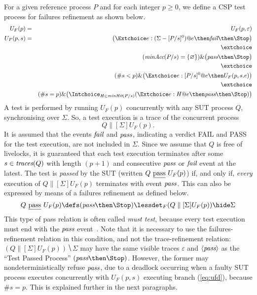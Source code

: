For a given reference process $P$ and for each integer $p\ge 0$, we define a
CSP test process for failures refinement as shown below.
%
\begin{eqnarray}
U_F(p) & = & U_F(p,\varepsilon)
\\
U_F(p,s) & = & \big( \Extchoice e:(\Sigma - [P/s]^0) @ e \then \efail\then \Stop \big)
\label{eq:ufa}
\\ & & \extchoice \nonumber
\\ & & (\minaccs(P/s) = \{ \varnothing \})    \&   \big( \epass \then \Stop \big)
\label{eq:ufb}
\\ & & \extchoice \nonumber
\\ & & (\#s < p) \& \big( \Extchoice e:[P/s]^0 @ e \then U_F(p,s.e) \big)
\label{eq:ufc}
\\ & & \extchoice \nonumber
\\ & & (\#s = p ) \& \big( \Intchoice_{H\in\minhits(P/s)} ( \Extchoice e:H @ e \then \epass \then\Stop   )  \big)
\label{eq:ufd}
\end{eqnarray}
%
A test is performed by running $U_F(p)$ concurrently with any SUT process
$Q$, synchronising over $\Sigma$. So, a test execution is a trace of
the concurrent process
\[
Q\parallel[\Sigma] U_F(p).
\]
It is assumed that the events ${\text{\it fail}}$ and ${\text{\it pass}}$, indicating a verdict
FAIL and PASS for the test execution, are not included in $\Sigma$. Since we
assume that $Q$ is free of livelocks, it is guaranteed that each test
execution terminates after some $s\in\text{\it traces}(Q)$ with length $(p+1)$ and
consecutive ${\text{\it pass}}$ or ${\text{\it fail}}$ event at the latest. The test is
\emph{passed} by the SUT (written $Q\ \pass\ U_F(p)$) if, and only if, {\it
every} execution of $Q\parallel[\Sigma] U_F(p)$ terminates with   event
${\text{\it pass}}$. This can also be  expressed by means of a failures refinement as
defined below.
%
\begin{equation}
\label{eq:passF}
Q\ \pass\ U_F(p) \defs (\epass\then\Stop) \lessdet_F (Q\parallel[\Sigma] U_F(p)) \hide \Sigma
\end{equation}
%
This type of pass relation is often called \emph{must test}, because every
test execution must end with the ${\text{\it pass}}$
event~\cite{Hennessy:1988:ATP:50497}. Note that it is necessary to use the
failures-refinement relation in this condition, and not the trace-refinement
relation:~$(Q\parallel[\Sigma] U_F(p)) \hide \Sigma$ may have  the same
visible traces $\varepsilon$ and $\langle {\text{\it pass}}\rangle$ as the ``Test Passed
Process'' $(\epass\then\Stop)$. However, the former may nondeterministically
refuse ${\text{\it pass}}$, due to a deadlock occurring when a faulty SUT process
executes concurrently with $U_F(p,s)$ executing branch (\ref{eq:ufd}),
because $\#s = p$. This is explained further in the next paragraphs.

